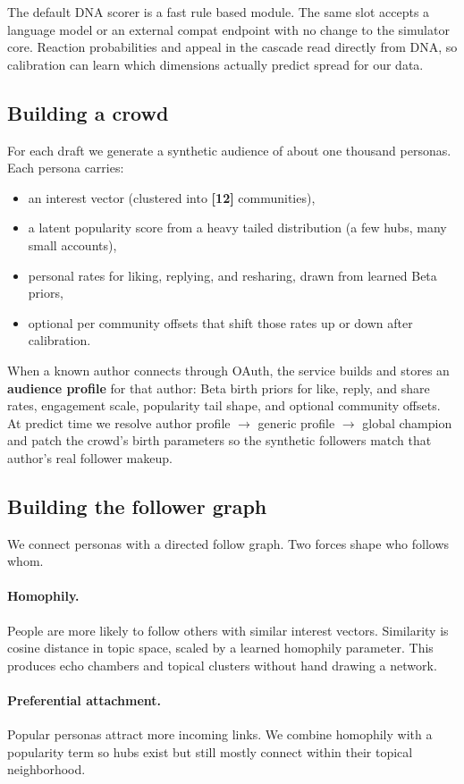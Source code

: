 \documentclass[11pt]{article}
\newcommand{\fill}[1]{\textbf{[#1]}}
\begin{document}
The default DNA scorer is a fast rule based module. The same slot accepts a
language model or an external compat endpoint with no change to the simulator
core. Reaction probabilities and appeal in the cascade read directly from DNA,
so calibration can learn which dimensions actually predict spread for our data.

\subsection{Building a crowd}
For each draft we generate a synthetic audience of about one thousand personas.
Each persona carries:
\begin{itemize}
  \item an interest vector (clustered into \fill{12} communities),
  \item a latent popularity score from a heavy tailed distribution (a few hubs, many
  small accounts),
  \item personal rates for liking, replying, and resharing, drawn from learned
  Beta priors,
  \item optional per community offsets that shift those rates up or down after
  calibration.
\end{itemize}
When a known author connects through OAuth, the service builds and stores an
\textbf{audience profile} for that author: Beta birth priors for like, reply,
and share rates, engagement scale, popularity tail shape, and optional community
offsets. At predict time we resolve author profile $\rightarrow$ generic profile
$\rightarrow$ global champion and patch the crowd's birth parameters so the
synthetic followers match that author's real follower makeup.

\subsection{Building the follower graph}
We connect personas with a directed follow graph. Two forces shape who follows
whom.

\paragraph{Homophily.}
People are more likely to follow others with similar interest vectors. Similarity
is cosine distance in topic space, scaled by a learned homophily parameter. This
produces echo chambers and topical clusters without hand drawing a network.

\paragraph{Preferential attachment.}
Popular personas attract more incoming links. We combine homophily with a
popularity term so hubs exist but still mostly connect within their topical
neighborhood.
\end{document}
